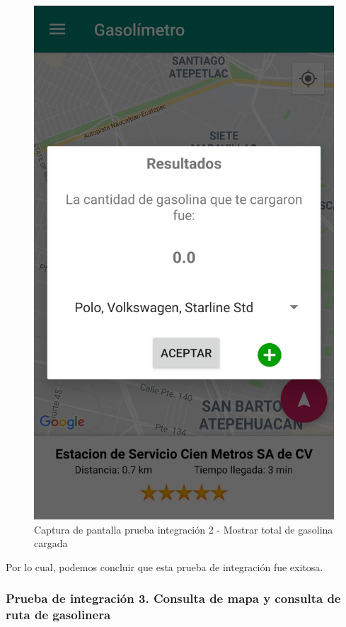 \begin{figure}[H]
	\centering
	\includegraphics[scale=.2]{DocumentoTecnico/Capitulo6/integracion/Software/images/10.png}
	\caption{Captura de pantalla prueba integración 2 - Mostrar total de gasolina cargada}
	\label{fig:int10}
\end{figure}

Por lo cual, podemos concluir que esta prueba de integración fue exitosa.

\subsubsection{Prueba de integración 3. Consulta de mapa y consulta de ruta de gasolinera}

